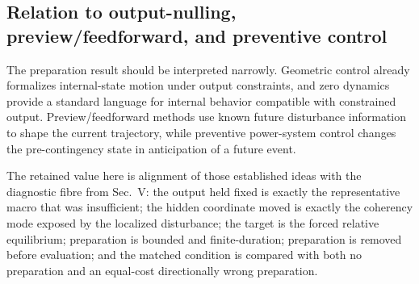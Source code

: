 \subsection{Relation to output-nulling, preview/feedforward, and preventive control}

The preparation result should be interpreted narrowly. Geometric control already formalizes internal-state motion under output constraints, and zero dynamics provide a standard language for internal behavior compatible with constrained output.\cite{Isidori2013,NtogramatzidisPadula2017} Preview/feedforward methods use known future disturbance information to shape the current trajectory, while preventive power-system control changes the pre-contingency state in anticipation of a future event.\cite{Goodwin2011,VermaNiazi2013,LiBose1995}

The retained value here is alignment of those established ideas with the diagnostic fibre from Sec.~V: the output held fixed is exactly the representative macro that was insufficient; the hidden coordinate moved is exactly the coherency mode exposed by the localized disturbance; the target is the forced relative equilibrium; preparation is bounded and finite-duration; preparation is removed before evaluation; and the matched condition is compared with both no preparation and an equal-cost directionally wrong preparation.


